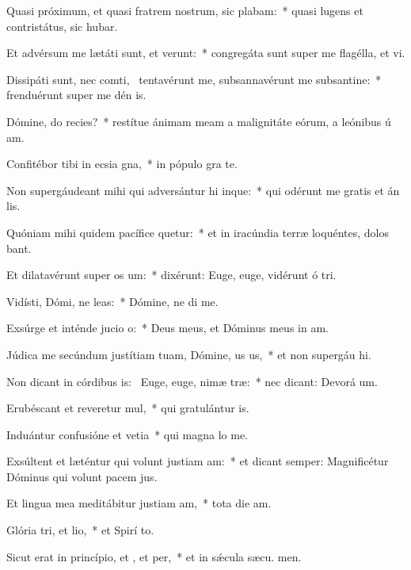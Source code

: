 \item Quasi próximum, et quasi fratrem nostrum, sic plabam:~* quasi lugens et contristátus, sic hubar.
\item Et advérsum me lætáti sunt, et verunt:~* congregáta sunt super me flagélla, et vi.
\item Dissipáti sunt, nec comti,~\pscross{} tentavérunt me, subsannavérunt me subsantine:~* frenduérunt super me dén is.
\item Dómine, do recies?~* restítue ánimam meam a malignitáte eórum, a leónibus ú am.
\item Confitébor tibi in ecsia gna,~* in pópulo gra  te.
\item Non supergáudeant mihi qui adversántur hi inque:~* qui odérunt me gratis et án lis.
\item Quóniam mihi quidem pacífice quetur:~* et in iracúndia terræ loquéntes, dolos bant.
\item Et dilatavérunt super  os um:~* dixérunt: Euge, euge, vidérunt ó tri.
\item Vidísti, Dómi, ne leas:~* Dómine, ne di  me.
\item Exsúrge et inténde jucio o:~* Deus meus, et Dóminus meus in  am.
\item Júdica me secúndum justítiam tuam, Dómine, us us,~* et non supergáu hi.
\item Non dicant in córdibus is:~\pscross{} Euge, euge, nimæ træ:~* nec dicant: Devorá um.
\item Erubéscant et reveretur mul,~* qui gratulántur  is.
\item Induántur confusióne et vetia~* qui magna lo  me.
\item Exsúltent et læténtur qui volunt justiam am:~* et dicant semper: Magnificétur Dóminus qui volunt pacem  jus.
\item Et lingua mea meditábitur justiam am,~* tota die  am.
\item Glória tri, et lio,~* et Spirí to.
\item Sicut erat in princípio, et , et per,~* et in sǽcula sæcu. men.
